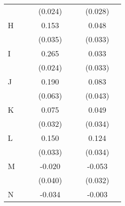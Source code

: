 {\begin{longtable}{l*{3}{c}|l*{3}{c}}
		&                     &                     &     (0.024)         &                     &                     &     (0.028)         \\
		H                   &                     &                     &       0.153\sym{***}&                     &                     &       0.048         \\
		&                     &                     &     (0.035)         &                     &                     &     (0.033)         \\
		I                   &                     &                     &       0.265\sym{***}&                     &                     &       0.033         \\
		&                     &                     &     (0.024)         &                     &                     &     (0.033)         \\
		J                   &                     &                     &       0.190\sym{**} &                     &                     &       0.083         \\
		&                     &                     &     (0.063)         &                     &                     &     (0.043)         \\
		K                   &                     &                     &       0.075\sym{*}  &                     &                     &       0.049         \\
		&                     &                     &     (0.032)         &                     &                     &     (0.034)         \\
		L                   &                     &                     &       0.150\sym{***}&                     &                     &       0.124\sym{***}\\
		&                     &                     &     (0.033)         &                     &                     &     (0.034)         \\
		M                   &                     &                     &      -0.020         &                     &                     &      -0.053         \\
		&                     &                     &     (0.040)         &                     &                     &     (0.032)         \\
		N                   &                     &                     &      -0.034         &                     &                     &      -0.003         \\

\end{longtable}}
